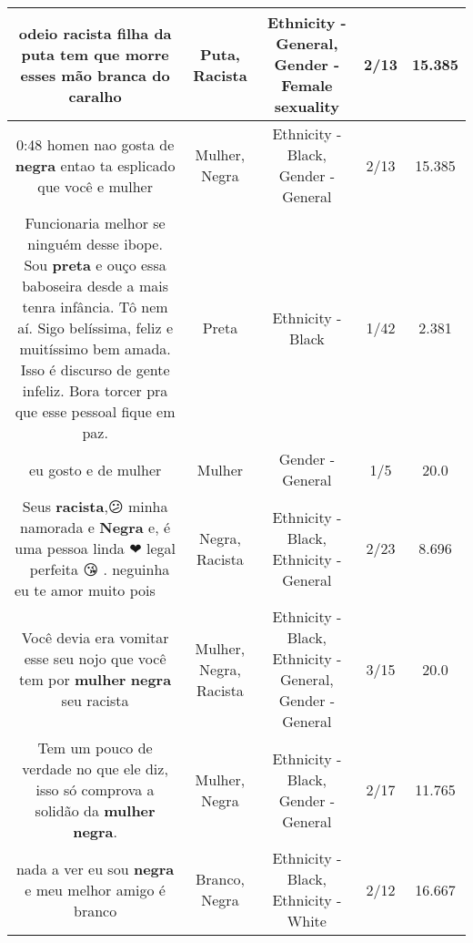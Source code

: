\documentclass[11pt]{article}
\newlength\mylength
\begin{document}
\begin{center}
\begin{longtable}{|C{.65\mylength}|C{.30\mylength}|C{.12\mylength}|C{.12\mylength}|C{.12\mylength}|}
  \small odeio \textbf{racista} filha da \textbf{puta} tem que morre esses mão branca do caralho\normalsize   & Puta, Racista & Ethnicity - General, Gender - Female sexuality & 2/13 & 15.385 \\  \hline
  \small 0:48 homen nao gosta de \textbf{negra} entao ta esplicado que você e mulher\normalsize   & Mulher, Negra & Ethnicity - Black, Gender - General & 2/13 & 15.385 \\  \hline
  \small Funcionaria melhor se ninguém desse ibope. Sou \textbf{preta} e ouço essa baboseira desde a mais tenra infância. Tô nem aí. Sigo belíssima, feliz e muitíssimo bem amada. Isso é discurso de gente infeliz. Bora torcer pra que esse pessoal fique em paz.\normalsize   & Preta & Ethnicity - Black & 1/42 & 2.381 \\  \hline
  \small eu gosto e de mulher\normalsize   & Mulher & Gender - General & 1/5 & 20.0 \\  \hline
  \small Seus \textbf{racista},😕 minha namorada e \textbf{Negra} e, é uma pessoa linda ❤ legal 💖 perfeita 😘 . neguinha eu te amor muito pois💖💖💖💖💖\normalsize   & Negra, Racista & Ethnicity - Black, Ethnicity - General & 2/23 & 8.696 \\  \hline
  \small Você devia era vomitar esse seu nojo que você tem por \textbf{mulher} \textbf{negra} seu racista\normalsize   & Mulher, Negra, Racista & Ethnicity - Black, Ethnicity - General, Gender - General & 3/15 & 20.0 \\  \hline
  \small Tem um pouco de verdade no que ele diz, isso só comprova a solidão da \textbf{mulher} \textbf{negra}.\normalsize   & Mulher, Negra & Ethnicity - Black, Gender - General & 2/17 & 11.765 \\  \hline
  \small nada a ver eu sou \textbf{negra} e meu melhor amigo é branco\normalsize   & Branco, Negra & Ethnicity - Black, Ethnicity - White & 2/12 & 16.667 \\  \hline

\end{longtable}
\end{center}
\end{document}
